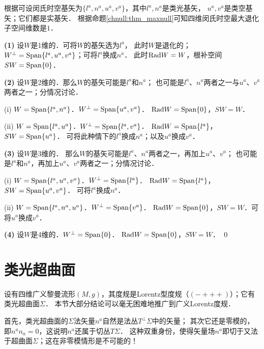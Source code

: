 根据可设闵氏时空基矢为$\{l^a,n^a, u^a, v^a\}$，其中$l^a,n^a$是类光基矢，
$u^a, v^a$是类空基矢；它们都是实基矢．
根据命题\ref{chnull:thm_maxnull}可知四维闵氏时空最大退化子空间维数是$1$．

{\noindent\heiti \bfseries (1)} 设$W$是1维的．可将$W$的基矢选为$l^a$，
此时$W$是退化的；$W^\perp ={\rm Span}\{l^a,u^a,v^a\}$；可将$l^a$换成$n^a$．
此时${\rm Rad}W=W$，根补空间$SW={\rm Span}\{0\}$．

{\noindent\heiti \bfseries (2)} 设$W$是2维的．那么$W$的基矢可能是$l^a$和$n^a$；
也可能是$l^a$、$n^a$两者之一与$u^a$、$v^a$两者之一；分情况讨论．

(i) $W={\rm Span}\{l^a,n^a\}$．$W^\perp ={\rm Span}\{u^a,v^a\}$．
${\rm Rad}W={\rm Span}\{0\}$，$SW=W$．

(ii) $W={\rm Span}\{l^a,u^a\}$．$W^\perp ={\rm Span}\{l^a,v^a\}$．
${\rm Rad}W={\rm Span}\{l^a\}$，$SW={\rm Span}\{u^a\}$．
可将此种情下的$l^a$换成$n^a$；以及$u^a$换成$v^a$．

{\noindent\heiti \bfseries (3)} 设$W$是3维的．
那么$W$的基矢可能是$l^a$、$n^a$两者之一，再加上$u^a$、$v^a$；
也可能是$l^a$和$n^a$，再加上$u^a$、$ v^a$两者之一；分情况讨论．

(i) $W={\rm Span}\{l^a,u^a, v^a\}$．$W^\perp ={\rm Span}\{l^a\}$．
${\rm Rad}W={\rm Span}\{l^a\}$，$SW={\rm Span}\{u^a,v^a\}$．
可将$l^a$换成$n^a$．

(ii) $W={\rm Span}\{l^a,n^a,u^a\}$．$W^\perp ={\rm Span}\{v^a\}$．
${\rm Rad}W={\rm Span}\{0\}$，$SW=W$．可将$u^a$换成$v^a$．

{\noindent\heiti \bfseries (4)} 设$W$是4维的．$W^\perp ={\rm Span}\{0\}$．
${\rm Rad}W={\rm Span}\{0\}$，$SW=W$．
\qed







\section{类光超曲面} \label{chnull:sec_hypersurface-null}

设有四维广义黎曼流形$(M,g)$，其度规是Lorentz型度规（$(-+++)$）；它有类光超曲面$\Sigma$．
本节大部分结论可以毫无困难地推广到广义Lorentz度规．

首先，类光超曲面的$\Sigma$法矢量${n}^{a}$自然是法丛$T^\bot\Sigma$中的矢量；
其次它还是零模的，即${n}^{a}{n}_{a}=0$，这说明$n^a$还属于切丛$T\Sigma$．
这种双重身份，使得矢量场$n^a$即切于又法于超曲面$\Sigma$；这在非零模情形是不可能的！

